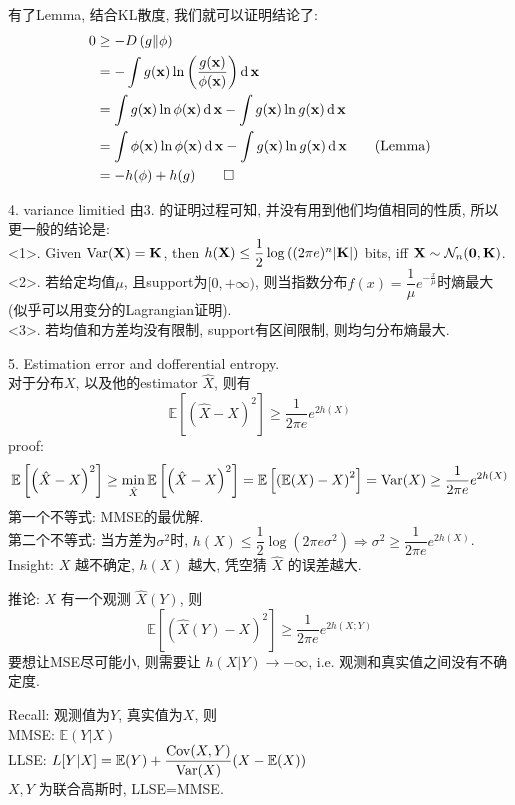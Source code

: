 有了Lemma, 结合KL散度, 我们就可以证明结论了:
\begin{align*}
0 &\geq -D\left(g\|\phi\right) \\
&= -\int g(\mathbf{x})\ln\left(\dfrac{g(\mathbf{x})}{\phi(\mathbf{x})}\right)\operatorname{d}\mathbf{x} \\
&= \int g(\mathbf{x})\ln \phi(\mathbf{x})\operatorname{d}\mathbf{x} - \int g(\mathbf{x})\ln g(\mathbf{x})\operatorname{d}\mathbf{x} \\
&= \int \phi(\mathbf{x})\ln \phi(\mathbf{x})\operatorname{d}\mathbf{x} - \int g(\mathbf{x})\ln g(\mathbf{x})\operatorname{d}\mathbf{x} \qquad \text{(Lemma)} \\
&= -h(\phi) + h(g) \qed
\end{align*}

4. variance limitied
由3. 的证明过程可知, 并没有用到他们均值相同的性质, 所以更一般的结论是: \\
<1>. Given $\operatorname{Var}(\mathbf{X})=\mathbf{K}$, then $h(\mathbf{X}) \leq \dfrac{1}{2}\log\left((2\pi e)^n|\mathbf{K}|\right)$ bits, iff $\mathbf{X}\sim\mathcal{N}_n(\mathbf{0},\mathbf{K})$. \\
<2>. 若给定均值$\mu$, 且support为$[0, +\infty)$, 则当指数分布$f(x)=\dfrac{1}{\mu}e^{-\frac{x}{\mu}}$时熵最大(似乎可以用变分的Lagrangian证明). \\
<3>. 若均值和方差均没有限制, support有区间限制, 则均匀分布熵最大.

5. Estimation error and dofferential entropy. \\
对于分布$X$, 以及他的estimator $\hat{X}$, 则有
$$\mathbb{E}\left[\left(\hat{X}-X\right)^2\right]\geq \dfrac{1}{2\pi e}e^{2h(X)}$$
proof:
$$\mathbb{E}\left[\left(\hat{X}-X\right)^2\right] \geq \min_{\hat{X}}\mathbb{E}\left[\left(\hat{X}-X\right)^2\right] = \mathbb{E}\left[\left(\mathbb{E}(X)-X\right)^2\right]=\operatorname{Var}(X)\geq \dfrac{1}{2\pi e}e^{2h(X)}$$
第一个不等式: MMSE的最优解. \\
第二个不等式: 当方差为$\sigma^2$时, $h(X)\leq \dfrac{1}{2}\log(2\pi e \sigma^2) \Rightarrow \sigma^2\geq \dfrac{1}{2\pi e}e^{2h(X)}$. \\
Insight: $X$ 越不确定, $h(X)$ 越大, 凭空猜 $\hat{X}$ 的误差越大.

推论: $X$ 有一个观测 $\hat{X}(Y)$, 则
$$\mathbb{E}\left[\left(\hat{X}(Y)-X\right)^2\right]\geq \dfrac{1}{2\pi e}e^{2h(X;Y)}$$
要想让MSE尽可能小, 则需要让 $h(X|Y)\to -\infty$, i.e. 观测和真实值之间没有不确定度.

Recall: 观测值为$Y$, 真实值为$X$, 则 \\
MMSE: $\mathbb{E}(Y|X)$ \\
LLSE: $L[Y|X]=\mathbb{E}(Y)+\dfrac{\operatorname{Cov}(X,Y)}{\operatorname{Var}(X)}(X-\mathbb{E}(X))$ \\
$X, Y$ 为联合高斯时, LLSE=MMSE.